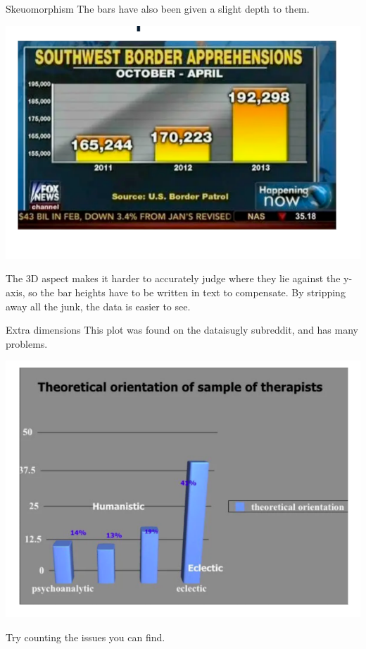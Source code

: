 \documentclass[
  ignorenonframetext,
]{beamer}
\begin{document}
\begin{frame}{Skeuomorphism}
\label{skeuomorphism-3}
The bars have also been given a slight depth to them.

\includegraphics{../images/im114.png}

The 3D aspect makes it harder to accurately judge where they lie against
the y-axis, so the bar heights have to be written in text to compensate.
By stripping away all the junk, the data is easier to see.
\end{frame}

\begin{frame}{Extra dimensions}
\label{extra-dimensions}
This plot was found on the dataisugly subreddit, and has many problems.

\includegraphics{../images/im115.png}

Try counting the issues you can find.
\end{frame}
\end{document}
